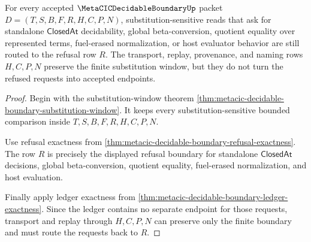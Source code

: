 \begin{theorem}
\label{thm:metacic-decidable-boundary-refusal-substitution-stability}
For every accepted $\MetaCICDecidableBoundaryUp$ packet $D=(T,S,B,F,R,H,C,P,N)$, substitution-sensitive reads that ask for standalone $\mathsf{ClosedAt}$ decidability, global beta-conversion, quotient equality over represented terms, fuel-erased normalization, or host evaluator behavior are still routed to the refusal row $R$. The transport, replay, provenance, and naming rows $H,C,P,N$ preserve the finite substitution window, but they do not turn the refused requests into accepted endpoints.
\end{theorem}
\begin{proof}
Begin with the substitution-window theorem \autoref{thm:metacic-decidable-boundary-substitution-window}. It keeps every substitution-sensitive bounded comparison inside $T,S,B,F,R,H,C,P,N$.

Use refusal exactness from \autoref{thm:metacic-decidable-boundary-refusal-exactness}. The row $R$ is precisely the displayed refusal boundary for standalone $\mathsf{ClosedAt}$ decisions, global beta-conversion, quotient equality, fuel-erased normalization, and host evaluation.

Finally apply ledger exactness from \autoref{thm:metacic-decidable-boundary-ledger-exactness}. Since the ledger contains no separate endpoint for those requests, transport and replay through $H,C,P,N$ can preserve only the finite boundary and must route the requests back to $R$.
\end{proof}

